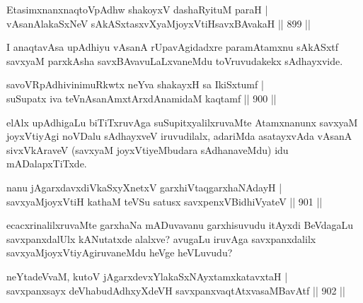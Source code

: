 
\begin{shl}
EtasimxnanxnaqtoVpAdhw shakoyxV dashaRyituM paraH | \\
vAsanAlakaSxNeV sAkASxtasxvXyaMjoyxVtiHsavxBAvakaH \hfill||  899 ||  
\end{shl}

\begin{artha}
I anaqtavAsa upAdhiyu vAsanA rUpavAgidadxre paramAtamxnu sAkASxtf savxyaM parxkAsha savxBAvavuLaLxvaneMdu toVruvudakekx sAdhayxvide.
\end{artha}


\begin{shl}
savoVRpAdhivinimuRkwtx neYva shakayxH sa IkiSxtumf | \\
suSupatx iva teVnAsanAmxtArxdAnamidaM kaqtamf \hfill||  900 ||  
\end{shl}

\begin{artha}
elAlx upAdhigaLu biTiTxruvAga suSupitxyalilxruvaMte Atamxnanunx savxyaM joyxVtiyAgi noVDalu sAdhayxveV iruvudilalx, adariMda asatayxvAda vAsanA sivxVkAraveV (savxyaM joyxVtiyeMbudara sAdhanaveMdu) idu mADalapxTiTxde.
\end{artha}


\begin{shl}
nanu jAgarxdavxdiVkaSxyXnetxV garxhiVtaqgarxhaNAdayH | \\
savxyaMjoyxVtiH kathaM teVSu satusx savxpenxV\s BidhiVyateV \hfill||  901 ||  
\end{shl}

\begin{artha}
ecacxrinalilxruvaMte garxhaNa mADuvavanu garxhisuvudu itAyxdi BeVdagaLu savxpanxdalUlx kANutatxde alalxve? avugaLu iruvAga savxpanxdalilx savxyaMjoyxVtiyAgiruvaneMdu heVge heVLuvudu?
\end{artha}


\begin{shl}
neYtadeVvaM, kutoV jAgarxdevxYlakaSxNAyxtamxkatavxtaH | \\
savxpanxsayx deVhabudAdhxyXdeVH savxpanxvaqtAtxvasaMBavAtf \hfill||  902 ||  
\end{shl}

